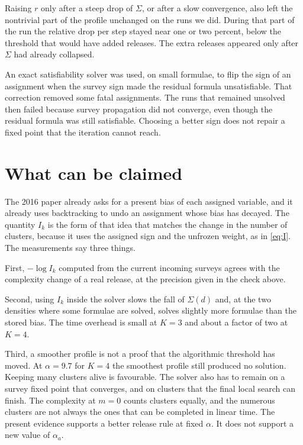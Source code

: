\documentclass[11pt]{article}
\begin{document}
Raising $r$ only after a steep drop of $\Sigma$, or after a slow convergence, also left the nontrivial part of the profile unchanged on the runs we did. During that part of the run the relative drop per step stayed near one or two percent, below the threshold that would have added releases. The extra releases appeared only after $\Sigma$ had already collapsed.

An exact satisfiability solver was used, on small formulae, to flip the sign of an assignment when the survey sign made the residual formula unsatisfiable. That correction removed some fatal assignments. The runs that remained unsolved then failed because survey propagation did not converge, even though the residual formula was still satisfiable. Choosing a better sign does not repair a fixed point that the iteration cannot reach.

\section{What can be claimed}

The 2016 paper already asks for a present bias of each assigned variable, and it already uses backtracking to undo an assignment whose bias has decayed. The quantity $I_k$ is the form of that idea that matches the change in the number of clusters, because it uses the assigned sign and the unfrozen weight, as in \eqref{eq:I}. The measurements say three things.

First, $-\log I_k$ computed from the current incoming surveys agrees with the complexity change of a real release, at the precision given in the check above.

Second, using $I_k$ inside the solver slows the fall of $\Sigma(d)$ and, at the two densities where some formulae are solved, solves slightly more formulae than the stored bias. The time overhead is small at $K=3$ and about a factor of two at $K=4$.

Third, a smoother profile is not a proof that the algorithmic threshold has moved. At $\alpha=9.7$ for $K=4$ the smoothest profile still produced no solution. Keeping many clusters alive is favourable. The solver also has to remain on a survey fixed point that converges, and on clusters that the final local search can finish. The complexity at $m=0$ counts clusters equally, and the numerous clusters are not always the ones that can be completed in linear time. The present evidence supports a better release rule at fixed $\alpha$. It does not support a new value of $\alpha_a$.
\end{document}
